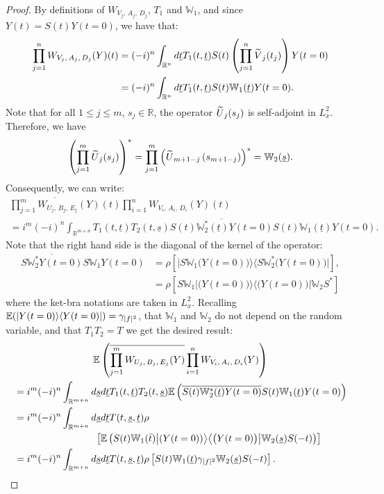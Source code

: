 \documentclass[AHL, Unicode, longabstracts,published]{cedram}
\newcommand{\R}{\mathbb{R}}
\newcommand{\E}{\mathbb{E}}
\newcommand{\bbW}{\mathbb{W}}
\let\oldtilde\tilde
\renewcommand*{\tilde}[1]{\mathchoice{\widetilde{#1}}{\widetilde{#1}}{\oldtilde{#1}}{\oldtilde{#1}}}
\begin{document}
\begin{proof}
By definitions of $W_{V_j,\,A_j,\,D_j} $, $T_1$ and $\bbW_1$, and since $Y(t)=S(t)Y(t=0)$, we have that:
\begin{align*}
\prod_{j=1}^n W_{V_j,\,A_j,\,D_j} (Y)(t)&= (-i)^n \int_{\R^n} d\underline t T_1(t,\underline t) S(t)\left(\prod_{j=1}^n \tilde V_j(t_{j})\right) Y(t=0)\\
&= (-i)^n \int_{\R^n} d\underline t T_1(t,\underline t) S(t)\bbW_1(\underline t) Y(t=0).
\end{align*}
Note that for all $1\leq j \leq m$, $s_j\in \R$, the operator $\tilde U_j(s_j)$ is self-adjoint in $L^2_x$. Therefore, we have
\[
\left(\prod_{j=1}^m \tilde U_j(s_{j})\right)^*= \prod_{j=1}^m \left(\tilde U_{m+1-j}\left(s_{m+1-j}\right)\right)^*=\bbW_2(\underline s).
\]
Consequently, we can write:
\begin{multline*}
\overline{\prod_{j=1}^m W_{U_j,\,B_j,\,E_j} (Y)}(t) \prod_{i=1}^n W_{V_i,\,A_i,\,D_i}(Y)(t)\\
=i^m(-i)^n \int_{\R^{m+n}} T_1(t,\underline t)T_2(t,\underline s)\overline{S(t)\bbW_2^*(\underline t) Y(t=0)} S(t)\bbW_1(\underline t) Y(t=0).
\end{multline*}
Note that the right hand side is the diagonal of the kernel of the operator:
\begin{align*}
\overline{S\bbW_2^* Y(t=0)}S\bbW_1Y(t=0)&=\rho\left[\big| S \bbW_1 \big(Y(t=0)\big) \big\rangle \big\langle S \bbW_2^* \big(Y(t=0)\big)\big|\right],\\
&=\rho \left[S \bbW_1 \big| \big(Y(t=0)\big) \big\rangle \big\langle \big(Y(t=0)\big)\big| \bbW_2S^*\right]
\end{align*}
where the ket-bra notations are taken in $L^2_x$. Recalling $\E(| Y(t=0) \rangle \langle Y(t=0) |)\linebreak= \gamma_{|f|^2}$, that $\bbW_1$ and $\bbW_2$ do not depend on the random variable, and that $T_1T_2=T$ we get the desired result:
\begin{multline*}
\E \left(\overline{\prod_{j=1}^m W_{U_j,\,B_j,\,E_j} (Y)} \prod_{i=1}^n W_{V_i,\,A_i,\,D_i}(Y)\right) \\
\begin{aligned}
& =i^m(-i)^n \int_{\R^{m+n}} d\underline s d\underline t T_1(t,\underline t)T_2(t,\underline s)\E \left(\overline{S(t)\bbW_2^*(\underline t) Y(t=0)} S(t)\bbW_1(\underline t) Y(t=0)\right) \\
& =i^m(-i)^n \int_{\R^{m+n}} d\underline s d\underline t T(t,\underline s,\underline t)\rho\\
&\mkern150mu\left[\E \left(S(t) \bbW_1(\bar t) \big| (Y(t=0)) \big\rangle \big\langle \big(Y(t=0)\big)\big| \bbW_2(\underline s)S(-t)\right)\right] \\
& =i^m(-i)^n \int_{\R^{m+n}} d\underline s d\underline t T(t,\underline s,\underline t)\rho \left[S(t) \bbW_1(\underline t) \gamma_{|f|^2} \bbW_2(\underline s)S(-t) \right].\qedhere
\end{aligned}
\end{multline*}
\end{proof}
\end{document}
